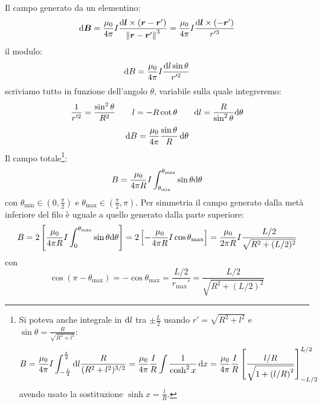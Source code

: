 \begin{Es}
\begin{figure}[htbp]
\end{figure}
Il campo generato da un elementino:
\begin{equation*}
 \mathrm{d}\boldsymbol{B} = \frac{\mu_0}{4\pi}I\frac{\mathrm{d}\boldsymbol{l}\times(\boldsymbol{r}-\boldsymbol{r}')}{\left\lVert\boldsymbol{r}-\boldsymbol{r}'\right\rVert^3}=\frac{\mu_0}{4\pi}I\frac{\mathrm{d}\boldsymbol{l}\times(-\boldsymbol{r}')}{r'^3}
\end{equation*}
il modulo:
\begin{equation*}
 \mathrm{d} B = \frac{\mu_0}{4\pi}I\frac{\mathrm{d} l\sin\theta}{r'^2}
\end{equation*}
scriviamo tutto in funzione dell'angolo $\theta$, variabile sulla quale integreremo:
\begin{equation*}
 \frac{1}{r'^2} = \frac{\sin^2\theta}{R^2}\qquad l = -R\cot\theta\qquad\mathrm{d} l = \frac{R}{\sin^2\theta}\mathrm{d}\theta
\end{equation*}
\begin{equation*}
 \mathrm{d} B = \frac{\mu_0}{4\pi}\frac{\sin\theta}{R}\,\mathrm{d}\theta
\end{equation*}
Il campo totale\footnote{Si poteva anche integrale in $\mathrm{d} l$ tra $\pm\frac{L}{2}$ usando $r'=\sqrt{R^2+l^2}$ e $\sin\theta=\frac{R}{\sqrt{R^2+l^2}}$:
\begin{equation*}
 B = \frac{\mu_0}{4\pi}I\int_{-\frac{L}{2}}^{\frac{L}{2}}\mathrm{d} l\frac{R}{(R^2+l^2)^{3/2}}=\frac{\mu_0}{4\pi}\frac{I}{R}\int\frac{1}{\cosh^2 x}\,\mathrm{d} x=\frac{\mu_0}{4\pi}\frac{I}{R}\left[\frac{l/R}{\sqrt{1+\left(l/R\right)^2}}\right]_{-L/2}^{L/2}
\end{equation*}
avendo usato la sostituzione $\sinh x=\frac{l}{R}$.
}:
\begin{equation*}
 B = \frac{\mu_0}{4\pi R}I\int_{\theta_\text{min}}^{\theta_\text{max}}\sin\theta\mathrm{d}\theta
\end{equation*}
con $\theta_\text{min}\in (0,\frac{\pi}{2})$ e $\theta_\text{max}\in (\frac{\pi}{2},\pi)$. Per simmetria il campo generato dalla metà inferiore del filo è uguale a quello generato dalla parte superiore:
\begin{equation*}
 B = 2\left[\frac{\mu_0}{4\pi R}I\int_{0}^{\theta_\text{max}}\sin\theta\mathrm{d}\theta\right]= 2\left[-\frac{\mu_0}{4\pi R}I\cos\theta_\text{max}\right]=\frac{\mu_0}{2\pi R}I\frac{L/2}{\sqrt{R^2+(L/2)^2}}
\end{equation*}
con
\begin{equation*}
 \cos(\pi-\theta_\text{max})=-\cos\theta_\text{max} = \frac{L/2}{r_\text{max}'}=\frac{L/2}{\sqrt{R^2+(L/2)^2}}
\end{equation*}

\end{Es}

